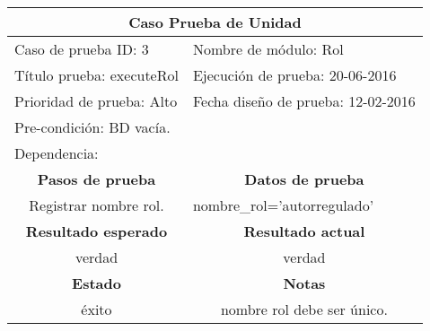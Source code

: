 \begin{itemize}
\begin{minipage}[!htb]{\hsize}\centering
\begin{tabular}{|c|c|}
\hline
\multicolumn{2}{|c|}{\textbf{Caso Prueba de Unidad}} \\ \hline
\multicolumn{1}{|l|}{Caso de prueba ID: 3} & \multicolumn{1}{l|}{Nombre de módulo: Rol} \\ \hline
\multicolumn{1}{|l|}{Título prueba: executeRol} & \multicolumn{1}{l|}{Ejecución de prueba: 20-06-2016} \\ \hline
\multicolumn{1}{|l|}{Prioridad de prueba: Alto} & \multicolumn{1}{l|}{Fecha diseño de prueba: 12-02-2016} \\ \hline
\multicolumn{2}{|l|}{Pre-condición: BD vacía.} \\ \hline
\multicolumn{2}{|l|}{Dependencia:} \\ \hline
\textbf{Pasos de prueba} & \textbf{Datos de prueba} \\ \hline
Registrar nombre rol. & \multicolumn{1}{l|}{nombre\_rol='autorregulado'} \\ \hline
\textbf{Resultado esperado} & \textbf{Resultado actual} \\ \hline
verdad & verdad \\ \hline
\textbf{Estado} & \textbf{Notas} \\ \hline
éxito & nombre rol debe ser único. \\ \hline
\end{tabular}
\label{Reporte prueba 3}
\end{minipage}


\end{itemize}
